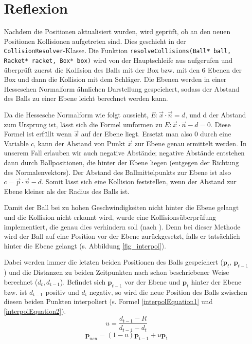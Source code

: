 \section{Reflexion}
\label{Kapitel_4_-_Unterkapitel_2}

Nachdem die Positionen aktualisiert wurden, wird geprüft, ob an den neuen Positionen Kollisionen aufgetreten sind. Dies geschieht in der {\texttt{CollisionResolver}}-Klasse. Die Funktion {\texttt{resolveCollisions(Ball* ball, Racket* racket, Box* box)}} wird von der Hauptschleife aus aufgerufen und überprüft zuerst die Kollision des Balls mit der Box bzw. mit den 6 Ebenen der Box und dann die Kollision mit dem Schläger.
Die Ebenen werden in einer Hesseschen Normalform ähnlichen Darstellung gespeichert, sodass der Abstand des Balls zu einer Ebene leicht berechnet werden kann.


Da die Hessesche Normalform wie folgt aussieht, $ E: \vec x \cdot \vec n  = d $, und d der Abstand zum Ursprung ist, lässt sich die Formel umformen zu $ E: \vec x \cdot \vec n  - d = 0$. Diese Formel ist erfüllt wenn $\vec x$ auf der Ebene liegt. Ersetzt man also 0 durch eine Variable $c$, kann der Abstand von Punkt $\vec x$ zur Ebene genau ermittelt werden. In unserem Fall erlauben wir auch negative Abstände; negative Abstände entstehen dann durch Ballpositionen, die hinter der Ebene liegen (entgegen der Richtung des Normalenvektors).
Der Abstand des Ballmittelpunkts zur Ebene ist also $c = \vec p\cdot \vec n - d $. Somit lässt sich eine Kollision feststellen, wenn der Abstand zur Ebene kleiner als der Radius des Balls ist.

Damit der Ball bei zu hohen Geschwindigkeiten nicht hinter die Ebene gelangt und die Kollision nicht erkannt wird, wurde eine Kollisionsüberprüfung implementiert, die genau dies verhindern soll (nach \cite{migGom:1999}). Denn bei dieser Methode wird der Ball auf eine Position vor der Ebene zurückgesetzt, falls er tatsächlich hinter die Ebene gelangt (s. Abbildung \ref{fig_interpol}). 

Dabei werden immer die letzten beiden Positionen des Balls gespeichert ($\mathbf{p}_t$, $\mathbf{p}_{t-1}$) und die Distanzen zu beiden Zeitpunkten nach schon beschriebener Weise berechnet ($d_t, d_{t-1}$).
Befindet sich $\mathbf{p}_{t-1}$ vor der Ebene und $\mathbf{p}_t$ hinter der Ebene bzw. ist $d_{t-1}$ positiv und $d_t$ negativ, so wird die neue Position des Balls zwischen diesen beiden Punkten interpoliert (s. Formel \ref{interpolEquation1} und \ref{interpolEquation2}). 
\begin{equation}	
\label{interpolEquation1}
	u = \frac{d_{t-1} - R}{d_{t-1} - d_t}
\end{equation}
\begin{equation}	
\label{interpolEquation2}
	\mathbf{p}_{neu} = (1-u)\mathbf{p}_{t-1} + u\mathbf{p}_t
\end{equation}

